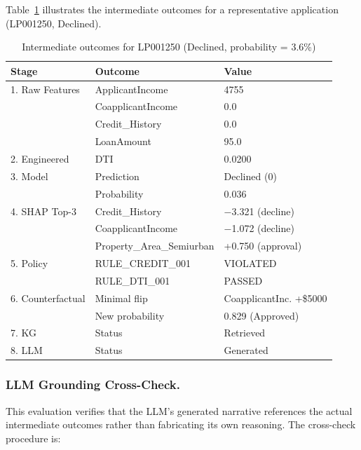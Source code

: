 \documentclass[lnbip]{svmultln}
\begin{document}
Table~\ref{tab:intermediate} illustrates the intermediate outcomes for a representative application (LP001250, Declined).

\begin{table}[htp]
    \centering
    \caption{Intermediate outcomes for LP001250 (Declined, probability = 3.6\%)}
    \label{tab:intermediate}
    \begin{tabular}{l l l}
        \toprule
        \textbf{Stage} & \textbf{Outcome} & \textbf{Value} \\
        \midrule
        1. Raw Features & ApplicantIncome & 4755 \\
         & CoapplicantIncome & 0.0 \\
         & Credit\_History & 0.0 \\
         & LoanAmount & 95.0 \\
        \midrule
        2. Engineered & DTI & 0.0200 \\
        \midrule
        3. Model & Prediction & Declined (0) \\
         & Probability & 0.036 \\
        \midrule
        4. SHAP Top-3 & Credit\_History & $-$3.321 (decline) \\
         & CoapplicantIncome & $-$1.072 (decline) \\
         & Property\_Area\_Semiurban & +0.750 (approval) \\
        \midrule
        5. Policy & RULE\_CREDIT\_001 & VIOLATED \\
         & RULE\_DTI\_001 & PASSED \\
        \midrule
        6. Counterfactual & Minimal flip & CoapplicantInc. +\$5000 \\
         & New probability & 0.829 (Approved) \\
        \midrule
        7. KG & Status & Retrieved \\
        8. LLM & Status & Generated \\
        \bottomrule
    \end{tabular}
\end{table}


\subsubsection{LLM Grounding Cross-Check.}

This evaluation verifies that the LLM's generated narrative references the actual intermediate outcomes rather than fabricating its own reasoning. The cross-check procedure is:
\end{document}
